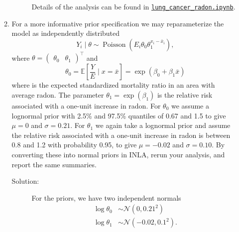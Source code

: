 \documentclass[letterpaper,11pt]{article}
\begin{document}
\begin{enumerate}
\begin{enumerate}
\begin{description}
      Details of the analysis can be found in
      \href{https://nbviewer.jupyter.org/github/ppham27/stat570/blob/master/hw5/lung\_cancer\_radon.ipynb}{\texttt{lung\_cancer\_radon.ipynb}}.
    \end{description}
  \item For a more informative prior specification we may reparameterize the
    model as independently distributed
    \begin{equation}
      Y_i \mid \theta \sim \operatorname{Poisson}\left(
        E_i\theta_0\theta_1^{x_i - \bar{x}_i}
      \right),
    \end{equation}
    where
    $\theta = \begin{pmatrix} \theta_0 & \theta_1\end{pmatrix}^\intercal$ and
    \begin{equation}
      \theta_0 = \mathbb{E}\left[\frac{Y}{E} \mid x = \bar{x}\right]
      = \exp\left(\beta_0 + \beta_1\bar{x}\right)
    \end{equation}
    where is the expected standardized mortality ratio in an area with average
    radon. The parameter $\theta_1 = \exp\left(\beta_1\right)$ is the relative
    risk associated with a one-unit increase in radon.  For $\theta_0$ we assume
    a lognormal prior with 2.5\% and 97.5\% quantiles of 0.67 and 1.5 to give
    $\mu = 0$ and $\sigma = 0.21$. For $\theta_1$ we again take a lognormal
    prior and assume the relative risk associated with a one-unit increase in
    radon is between 0.8 and 1.2 with probability 0.95, to give $\mu = -0.02$
    and $\sigma = 0.10$. By converting these into normal priors in INLA, rerun
    your analysis, and report the same summaries.

    \begin{description}
    \item[Solution:] For the priors, we have two independent normals
      \begin{align*}
        \log\theta_0
        &\sim \mathcal{N}\left(0, 0.21^2\right) \\
        \log\theta_1
        &\sim \mathcal{N}\left(-0.02, 0.1^2\right).
      \end{align*}


\end{description}
\end{enumerate}
\end{enumerate}
\end{document}
